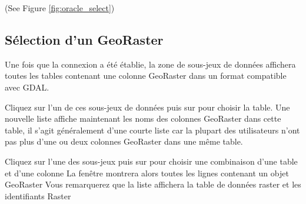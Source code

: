 
(See Figure \ref{fig:oracle_select})

\subsection{Sélection d'un GeoRaster}


Une fois que la connexion a été établie, la zone de sous-jeux de données affichera toutes les tables contenant une colonne GeoRaster dans un format compatible avec GDAL.


Cliquez sur l'un de ces sous-jeux de données puis sur  pour choisir la table. Une nouvelle liste affiche maintenant les noms des colonnes GeoRaster dans cette table, il s'agit généralement d'une courte liste car la plupart des utilisateurs n'ont pas plus d'une ou deux colonnes GeoRaster dans une même table.


Cliquez sur l'une des sous-jeux puis sur  pour choisir une combinaison d'une table et d'une colonne La fenêtre montrera alors toutes les lignes contenant un objet GeoRaster Vous remarquerez que la liste affichera la table de données raster et les identifiants Raster

